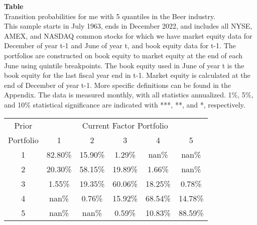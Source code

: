 \begin{table*}[ht!]
\raggedright
{}
\label{tab: transition_probs_me_Beer_with_5_quantiles}
\textbf{Table \thetable} \\
Transition probabilities for me with 5 quantiles in the Beer industry. \\
\hspace*{1em}This sample starts in July 1963, ends in December 2022, and includes all NYSE, AMEX, and NASDAQ common stocks for which we have market equity data for December of year t-1 and June of year t, and book equity data for t-1. The portfolios are constructed on book equity to market equity at the end of each June using quintile breakpoints.  The book equity used in June of year t is the book equity for the last fiscal year end in t-1.  Market equity is calculated at the end of December of year t-1.  More specific definitions can be found in the Appendix.  The data is measured monthly, with all statistics annualized.  1\%, 5\%, and 10\% statistical significance are indicated with ***, **, and *, respectively. \\
\vspace{0.5em}
\centering
\begin{adjustbox}{max width=\textwidth}
\begin{tabular}{@{}cccccc@{}}
\toprule
Prior & \multicolumn{5}{c}{Current Factor Portfolio} \\
Portfolio & 1 & 2 & 3 & 4 & 5 \\
\midrule
1 & 82.80\% & 15.90\% & 1.29\% & nan\% & nan\% \\
2 & 20.30\% & 58.15\% & 19.89\% & 1.66\% & nan\% \\
3 & 1.55\% & 19.35\% & 60.06\% & 18.25\% & 0.78\% \\
4 & nan\% & 0.76\% & 15.92\% & 68.54\% & 14.78\% \\
5 & nan\% & nan\% & 0.59\% & 10.83\% & 88.59\% \\
\bottomrule
\end{tabular}
\end{adjustbox}
\end{table*}